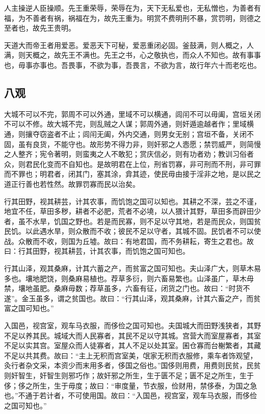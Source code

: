 \documentclass[]{article}
\begin{document}
人主操逆人臣操顺。先王重荣辱，荣辱在为，天下无私爱也，无私憎也，为善者有福，为不善者有祸，祸福在为，故先王重为。明赏不费明刑不暴，赏罚明，则德之至者也，故先王贵明。

天道大而帝王者用爱恶。爱恶天下可秘，爱恶重闭必固。釜鼓满，则人概之，人满，则天概之，故先王不满也。先王之书，心之敬执也，而众人不知也。故有事事也，毋事亦事也。吾畏事，不欲为事，吾畏言，不欲为言，故行年六十而老吃也。

\hypertarget{header-n235}{%
\subsection{八观 }\label{header-n235}}

大城不可以不完，郭周不可以外通，里域不可以横通，闾闬不可以毋阖，宫垣关闭不可以不修。故大城不完，则乱贼之人谋；郭周外通，则奸遁逾越者作；里域横通，则攘夺窃盗者不止；闾闬无阖，外内交通，则男女无别；宫垣不备，关闭不固，虽有良货，不能守也。故形势不得力非，则奸邪之人悫愿；禁罚威严，则简慢之人整齐；宪令著明，则蛮夷之人不敢犯；赏庆信必，则有功者劝；教训习俗者众，则君民化变而不自知也。是故明君在上位，刑省罚寡，非可刑而不刑，非可罪而不罪也；明君者，闭其门，塞其涂，弇其迹，使民毋由接于淫非之地，是以民之道正行善也若性然。故罪罚寡而民以治矣。

行其田野，视其耕芸，计其农事，而饥饱之国可以知也。其耕之不深，芸之不谨，地宜不任，草田多秽，耕者不必肥，荒者不必墝，以人猥计其野，草田多而辟田少者，虽不水旱，饥国之野也。若是而民寡，则不足以守其地，若是而民众，则国贫民饥。以此遇水旱，则众散而不收；彼民不足以守者，其城不固。民饥者不可以使战。众散而不收，则国为丘墟。故曰：有地君国，而不务耕耘，寄生之君也。故曰：行其田野，视其耕芸，计其农事，而饥饱之国可知也。

行其山泽，观其桑麻，计其六蓄之产，而贫富之国可知也。夫山泽广大，则草木易多也。壤地肥饶，则桑麻易植也。荐草多衍，则六畜易繁也。山泽虽广，草木毋禁，壤地虽肥。桑麻毋数；荐草虽多，六畜有征，闭货之门也。故曰：``时货不遂''。金玉虽多，谓之贫国也。故曰：``行其山泽，观其桑麻，计其六畜之产，而贫富之国可知也。''

入国邑，视宫室，观车马衣服，而侈俭之国可知也。夫国城大而田野浅狭者，其野不足以养其民。城域大而人民寡者，其民不足以守其城。宫营大而室屋寡者，其室不足以实其宫。室屋众而人徒寡者，其人不足以处其室。囷仓寡而台榭繁者，其藏不足以共其费。故曰：``主上无积而宫室美，氓家无积而衣服修，乘车者饰观望，灸行者杂文采，本资少而末用多者，侈国之俗也。''国侈则用费，用费则民贫，民贫则奸智生，奸智生则邪巧作；故奸邪之所生，生于匮不足；匮不足之所生，生于侈；侈之所生，生于毋度；故曰：``审度量，节衣服，俭财用，禁侈泰，为国之急也。''不通于若计者，不可使用国。故曰：``入国邑，视宫室，观车马衣服，而侈俭之国可知也。''
\end{document}
